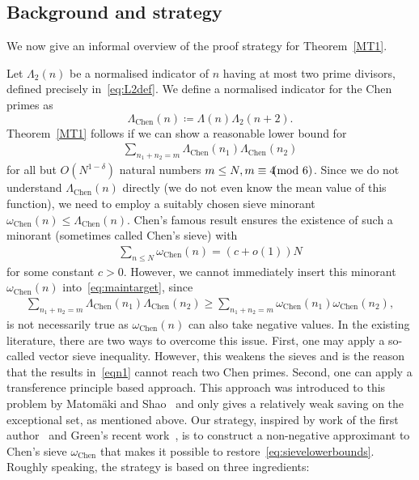 \documentclass[12pt]{amsart}
\theoremstyle{definition}
\theoremstyle{remark}
\numberwithin{equation}{section}
\newcommand{\1}{\mathbf{1}}
\let\oldpmod\pmod
\renewcommand{\pmod}[1]{\hspace{-0.12cm}\oldpmod {#1}}
\begin{document}
\subsection{Background and strategy}

We now give an informal overview of the proof strategy for Theorem~\ref{MT1}.

Let $\Lambda_2(n)$ be a normalised indicator of $n$ having at most two prime divisors, defined precisely in~\eqref{eq:L2def}. We define a normalised indicator for the Chen primes as 
$$\Lambda_{\text{Chen}}(n)\coloneqq \Lambda(n)\Lambda_2(n+2).$$
Theorem~\ref{MT1} follows if we can show a reasonable lower bound for
\begin{align}\label{eq:maintarget}
    	\sum_{n_1+n_2=m}\Lambda_{\text{Chen}}(n_1)\Lambda_{\text{Chen}}(n_2)
\end{align}
for all but $O(N^{1-\delta})$ natural numbers $m\leq N, m\equiv 4 \pmod{6}$. Since we do not understand $\Lambda_{\text{Chen}}(n)$ directly (we do not even know the mean value of this function), we need to employ a suitably chosen sieve minorant $\omega_{\text{Chen}}(n)\leq \Lambda_{\text{Chen}}(n)$. Chen's famous result ensures the existence of such a minorant (sometimes called Chen's sieve) with
\begin{align}
    \sum_{n\leq N} \omega_{\text{Chen}}(n)= (c+o(1))N
\end{align}
for some constant $c>0$. However, we cannot immediately insert this minorant $\omega_{\text{Chen}}(n)$ into~\eqref{eq:maintarget}, since
\begin{align}\label{eq:sievelowerbounds}
	\sum_{n_1+n_2=m}\Lambda_{\text{Chen}}(n_1)\Lambda_{\text{Chen}}(n_2)\geq  \sum_{n_1+n_2=m}\omega_{\text{Chen}}(n_1)\omega_{\text{Chen}}(n_2),
\end{align}
is not necessarily true as $\omega_{\text{Chen}}(n)$ can also take negative values. In the existing literature, there are two ways to overcome this issue. First, one may apply a so-called vector sieve inequality. However, this weakens the sieves and is the reason that the results in~\eqref{eqn1} cannot reach two Chen primes. Second, one can apply a transference principle based approach. This approach was introduced to this problem by Matom\"aki and Shao~\cite{matomaki-shao} and only gives a relatively weak saving on the exceptional set, as mentioned above. Our strategy, inspired by work of the first author~\cite{grimmelt-nonneg} and Green's recent work~\cite{green-sarkozy}, is to construct a non-negative approximant to Chen's sieve $\omega_{\text{Chen}}$ that makes it possible to restore~\eqref{eq:sievelowerbounds}. Roughly speaking, the strategy is based on three ingredients: 
\end{document}
